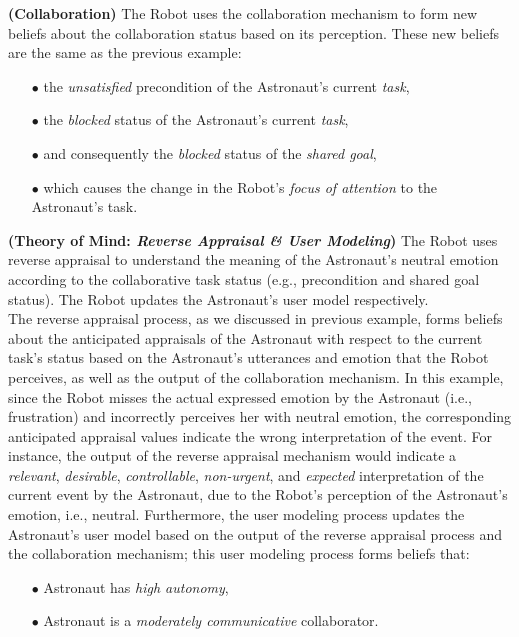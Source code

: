 \noindent\textbf{(Collaboration)} The Robot uses the collaboration mechanism to
form new beliefs about the collaboration status based on its perception. These
new beliefs are the same as the previous example:

\begin{itemize}
  \item[$\bullet$] the \textit{unsatisfied} precondition of the Astronaut's
  current \textit{task},
  \item[$\bullet$] the \textit{blocked} status of the Astronaut's current
  \textit{task},
  \item[$\bullet$] and consequently the \textit{blocked} status of the
  \textit{shared goal},
  \item[$\bullet$] which causes the change in the Robot's \textit{focus of
  attention} to the Astronaut's task.
\end{itemize}

\noindent\textbf{(Theory of Mind: \textit{Reverse Appraisal \& User Modeling})}
The Robot uses reverse appraisal to understand the meaning of the Astronaut's
neutral emotion according to the collaborative task status (e.g., precondition
and shared goal status). The Robot updates the Astronaut's user model
respectively.\\

The reverse appraisal process, as we discussed in previous example, forms
beliefs about the anticipated appraisals of the Astronaut with respect to the
current task's status based on the Astronaut's utterances and emotion that the
Robot perceives, as well as the output of the collaboration mechanism. In this
example, since the Robot misses the actual expressed emotion by the Astronaut
(i.e., frustration) and incorrectly perceives her with neutral emotion, the
corresponding anticipated appraisal values indicate the wrong interpretation of
the event. For instance, the output of the reverse appraisal mechanism would
indicate a \textit{relevant}, \textit{desirable}, \textit{controllable},
\textit{non-urgent}, and \textit{expected} interpretation of the current event
by the Astronaut, due to the Robot's perception of the Astronaut's emotion,
i.e., neutral. Furthermore, the user modeling process updates the Astronaut's
user model based on the output of the reverse appraisal process and the
collaboration mechanism; this user modeling process forms beliefs that:\\

\begin{itemize}
  \item[$\bullet$] Astronaut has \textit{high autonomy},
  \item[$\bullet$] Astronaut is a \textit{moderately communicative}
  collaborator.
\end{itemize}

